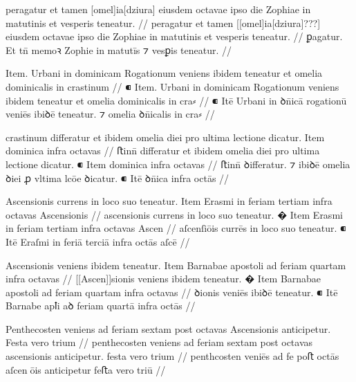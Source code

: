 \ex \bg
\gla
{}
peragatur
et tamen [omel]ia[dziura] eiusdem octavae ipso die Zophiae in matutinis et
vesperis teneatur.
//
\glRekonstrukcja
{}
peragatur
et tamen [[omel]ia[dziura]???] eiusdem octavae ipso die Zophiae in matutinis et
vesperis teneatur.
//
\glU
{}
ꝑagatur. Et tn̄ memoꝛ     Zophie in matutīs ⁊ vesꝑis teneatur.
//
\endgl
\xe


\ex \bg
\gla
{}
{} Item. Urbani in dominicam Rogationum veniens ibidem teneatur
et omelia dominicalis in crastinum
//
\glRekonstrukcja
{}
⁌ Item. Urbani in dominicam Rogationum veniens ibidem teneatur
et omelia dominicalis in cra⸗
//
\glU
{}
⁌ Itē Urbani in ꝺn̄icā rogationū veniēs ibiꝺē teneatur. ⁊ omelia ꝺn̄icalis in cra⸗
//
\endgl
\xe



\ex \bg
\gla
{}
crastinum differatur et ibidem omelia diei pro
ultima lectione dicatur.
{} Item dominica infra octavas
//
\glRekonstrukcja
{}
ﬅinn̄ differatur et ibidem omelia diei pro
ultima lectione dicatur.
⁌ Item dominica infra octavas
//
\glU
{}
ﬅinn̄ ꝺiﬀeratur. ⁊ ibiꝺē omelia ꝺiei ꝓ vltima lcōe ꝺicatur. ⁌ Itē ꝺn̄ica infra octās
//
\endgl
\xe



\ex \bg
\gla
{}
Ascensionis currens in loco suo teneatur.
{} Item Erasmi in feriam tertiam infra octavas Ascensionis
//
\glRekonstrukcja
{}
ascensionis currens in loco suo teneatur.
� Item Erasmi in feriam tertiam infra octavas Ascen
//
\glU
{}
{}
aſcenſiōis currēs in loco suo teneatur. ⁌ Itē Eraſmi in feriā terciā infra octās aſcē
//
\endgl
\xe



\ex \bg
\gla
{}
Ascensionis veniens
ibidem teneatur. 
{} Item Barnabae apostoli ad feriam quartam infra octavas
//
\glRekonstrukcja
{}
[[Ascen]]sionis veniens
ibidem teneatur. � Item Barnabae apostoli ad feriam quartam infra octavas
//
\glU
{}
ꝺionis veniēs ibiꝺē teneatur. ⁌ Itē Barnabe apꝉi aꝺ feriam quartā infra octās
//
\endgl
\xe



\ex \bg
\gla
{}
Penthecosten veniens ad feriam sextam post octavas Ascensionis anticipetur.
Festa vero trium
//
\glRekonstrukcja
{}
penthecosten veniens ad feriam sextam post octavas ascensionis anticipetur.
festa vero trium
//
\glU
{}
penthcosten veniēs ad fe   poﬅ octās aſcenōis anticipetur feﬅa vero triū
//
\endgl
\xe




